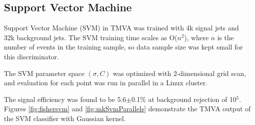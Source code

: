 \documentclass[a4paper]{jpconf}
\begin{document}


\subsection{Support Vector Machine}
Support Vector Machine (SVM) in TMVA
was trained with 4k signal jets and 32k background jets.
The SVM training time  scales as O($n^2$), where $n$ is the number of events in the training sample,
so data sample size was kept small for this discriminator.

The SVM parameter space $(\sigma, C)$
was optimized with 2-dimensional grid scan,  
and evaluation for each point was run in parallel in a Linux cluster.

The signal efficiency was found to be 5.6$\pm$0.1\% at background rejection of 10$^5$.
Figures 
\ref{fig:fishersvm}
 and \ref{fig:mkSvmParallels} demonstrate the TMVA output of the SVM classifier
with Gaussian kernel.


%

 
\end{document}

